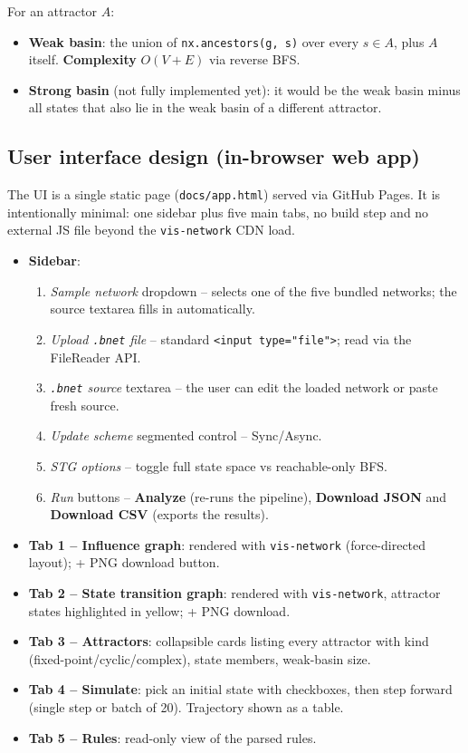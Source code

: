 \documentclass[oneside,final]{hcmut-report}
\begin{document}
For an attractor $A$:
\begin{itemize}[leftmargin=*]
    \item \textbf{Weak basin}: the union of \texttt{nx.ancestors(g, s)} over every $s \in A$, plus $A$ itself. \textbf{Complexity} $O(V + E)$ via reverse BFS.
    \item \textbf{Strong basin} (not fully implemented yet): it would be the weak basin minus all states that also lie in the weak basin of a different attractor.
\end{itemize}

\subsection{User interface design (in-browser web app)}\label{subsec:ui-design}

The UI is a single static page (\texttt{docs/app.html}) served via GitHub Pages. It is intentionally minimal: one sidebar plus five main tabs, no build step and no external JS file beyond the \texttt{vis-network} CDN load.

\begin{itemize}[leftmargin=*]
    \item \textbf{Sidebar}:
    \begin{enumerate}
        \item \textit{Sample network} dropdown -- selects one of the five bundled networks; the source textarea fills in automatically.
        \item \textit{Upload \texttt{.bnet} file} -- standard \texttt{<input type="file">}; read via the FileReader API.
        \item \textit{\texttt{.bnet} source} textarea -- the user can edit the loaded network or paste fresh source.
        \item \textit{Update scheme} segmented control -- Sync/Async.
        \item \textit{STG options} -- toggle full state space vs reachable-only BFS.
        \item \textit{Run} buttons -- \textbf{Analyze} (re-runs the pipeline), \textbf{Download JSON} and \textbf{Download CSV} (exports the results).
    \end{enumerate}
    \item \textbf{Tab 1 -- Influence graph}: rendered with \texttt{vis-network} (force-directed layout); + PNG download button.
    \item \textbf{Tab 2 -- State transition graph}: rendered with \texttt{vis-network}, attractor states highlighted in yellow; + PNG download.
    \item \textbf{Tab 3 -- Attractors}: collapsible cards listing every attractor with kind (fixed-point/cyclic/complex), state members, weak-basin size.
    \item \textbf{Tab 4 -- Simulate}: pick an initial state with checkboxes, then step forward (single step or batch of 20). Trajectory shown as a table.
    \item \textbf{Tab 5 -- Rules}: read-only view of the parsed rules.
\end{itemize}
\end{document}

